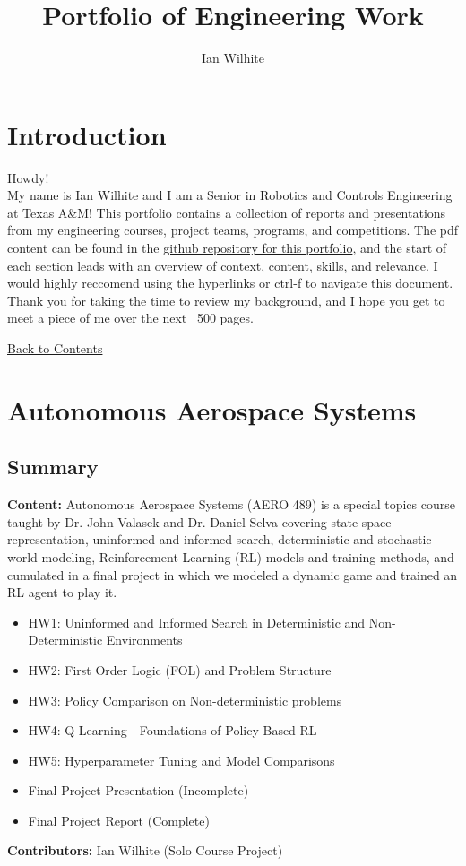 \documentclass[a4paper,12pt]{article}
\title{Portfolio of Engineering Work}
\author{Ian Wilhite}
\begin{document}
\sloppy


\section*{Introduction}
Howdy! \\
My name is Ian Wilhite and I am a Senior in Robotics and Controls Engineering at Texas A\&M! This portfolio contains a collection of reports and presentations from my engineering courses, project teams, programs, and competitions. The pdf content can be found in the \hyperlink{https://github.com/Ian-Wilhite/engineering-portfolio/}{github repository for this portfolio}, and the start of each section leads with an overview of context, content, skills, and relevance. I would highly reccomend using the hyperlinks or ctrl-f to navigate this document. 
Thank you for taking the time to review my background, and I hope you get to meet a piece of me over the next ~500 pages.

{}
\label{toc}
\tableofcontents
\newpage

\hyperlink{toc}{Back to Contents}
\section{Autonomous Aerospace Systems}
\subsection*{Summary}
\textbf{Content:} Autonomous Aerospace Systems (AERO 489) is a special topics course taught by Dr. John Valasek and Dr. Daniel Selva covering state space representation, uninformed and informed search, deterministic and stochastic world modeling, Reinforcement Learning (RL) models and training methods, and cumulated in a final project in which we modeled a dynamic game and trained an RL agent to play it. 
\begin{itemize}
    \item HW1: Uninformed and Informed Search in Deterministic and Non-Deterministic Environments 
    \item HW2: First Order Logic (FOL) and Problem Structure
    \item HW3: Policy Comparison on Non-deterministic problems
    \item HW4: Q Learning - Foundations of Policy-Based RL
    \item HW5: Hyperparameter Tuning and Model Comparisons  
    \item Final Project Presentation (Incomplete)
    \item Final Project Report (Complete)
\end{itemize}
\textbf{Contributors:} Ian Wilhite (Solo Course Project)
\end{document}
